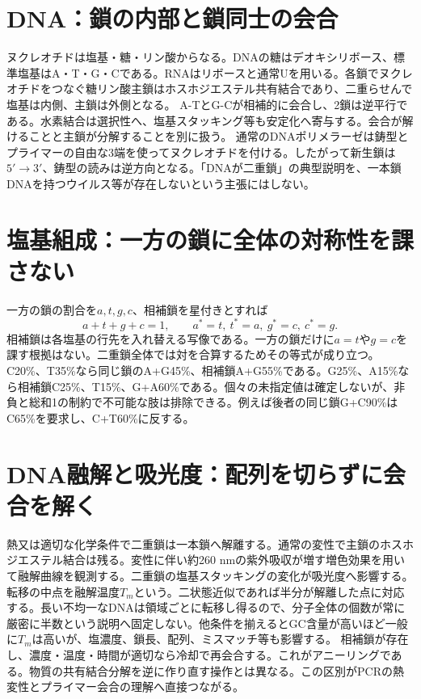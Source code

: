 \section{DNA：鎖の内部と鎖同士の会合}
\label{theory:biology:dna}
ヌクレオチドは塩基・糖・リン酸からなる。DNAの糖はデオキシリボース、標準塩基はA・T・G・Cである。RNAはリボースと通常Uを用いる。各鎖でヌクレオチドをつなぐ糖リン酸主鎖はホスホジエステル共有結合であり、二重らせんで塩基は内側、主鎖は外側となる。
A-TとG-Cが相補的に会合し、2鎖は逆平行である\autocite{nhgri_dna}。水素結合は選択性へ、塩基スタッキング等も安定化へ寄与する。会合が解けることと主鎖が分解することを別に扱う。
通常のDNAポリメラーゼは鋳型とプライマーの自由な3端を使ってヌクレオチドを付ける。したがって新生鎖は\(5'\to3'\)、鋳型の読みは逆方向となる。「DNAが二重鎖」の典型説明を、一本鎖DNAを持つウイルス等が存在しないという主張にはしない。

\section{塩基組成：一方の鎖に全体の対称性を課さない}
\label{theory:biology:base_fraction}
一方の鎖の割合を\(a,t,g,c\)、相補鎖を星付きとすれば
\begin{equation}
 a+t+g+c=1,\qquad
 a^{*}=t,\ t^{*}=a,\ g^{*}=c,\ c^{*}=g.
\end{equation}
相補鎖は各塩基の行先を入れ替える写像である。一方の鎖だけに\(a=t\)や\(g=c\)を課す根拠はない。二重鎖全体では対を合算するためその等式が成り立つ。
C20\%、T35\%なら同じ鎖のA+G45\%、相補鎖A+G55\%である。G25\%、A15\%なら相補鎖C25\%、T15\%、G+A60\%である。個々の未指定値は確定しないが、非負と総和1の制約で不可能な肢は排除できる。例えば後者の同じ鎖G+C90\%はC65\%を要求し、C+T60\%に反する。

\section{DNA融解と吸光度：配列を切らずに会合を解く}
\label{theory:biology:melting}
熱又は適切な化学条件で二重鎖は一本鎖へ解離する。通常の変性で主鎖のホスホジエステル結合は残る。変性に伴い約260 nmの紫外吸収が増す増色効果を用いて融解曲線を観測する\autocite{bu_dna_melting}。二重鎖の塩基スタッキングの変化が吸光度へ影響する。
転移の中点を融解温度\(T_m\)という。二状態近似であれば半分が解離した点に対応する。長い不均一なDNAは領域ごとに転移し得るので、分子全体の個数が常に厳密に半数という説明へ固定しない。他条件を揃えるとGC含量が高いほど一般に\(T_m\)は高いが、塩濃度、鎖長、配列、ミスマッチ等も影響する。
相補鎖が存在し、濃度・温度・時間が適切なら冷却で再会合する。これがアニーリングである。物質の共有結合分解を逆に作り直す操作とは異なる。この区別がPCRの熱変性とプライマー会合の理解へ直接つながる。

